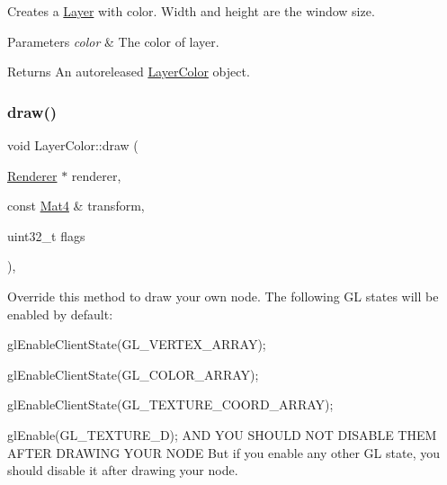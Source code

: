 Creates a \hyperlink{classLayer}{Layer} with color. Width and height are the window size.


\begin{DoxyParams}{Parameters}
{\em color} & The color of layer. \\
\hline
\end{DoxyParams}
\begin{DoxyReturn}{Returns}
An autoreleased \hyperlink{classLayerColor}{Layer\+Color} object. 
\end{DoxyReturn}
\mbox{\label{classLayerColor_ac36be7e85a4e14c1c043598c772f67e4}} 
\subsubsection{\texorpdfstring{draw()}{draw()}\hspace{0.1cm}{\footnotesize\ttfamily [1/2]}}
{\footnotesize\ttfamily void Layer\+Color\+::draw (\begin{DoxyParamCaption}\item[{\hyperlink{classRenderer}{Renderer} $\ast$}]{renderer,  }\item[{const \hyperlink{classMat4}{Mat4} \&}]{transform,  }\item[{uint32\+\_\+t}]{flags }\end{DoxyParamCaption})\hspace{0.3cm}{\ttfamily [override]}, {\ttfamily [virtual]}}

Override this method to draw your own node. The following GL states will be enabled by default\+:
\begin{DoxyItemize}
\item {\ttfamily gl\+Enable\+Client\+State(\+G\+L\+\_\+\+V\+E\+R\+T\+E\+X\+\_\+\+A\+R\+R\+A\+Y);}
\item {\ttfamily gl\+Enable\+Client\+State(\+G\+L\+\_\+\+C\+O\+L\+O\+R\+\_\+\+A\+R\+R\+A\+Y);}
\item {\ttfamily gl\+Enable\+Client\+State(\+G\+L\+\_\+\+T\+E\+X\+T\+U\+R\+E\+\_\+\+C\+O\+O\+R\+D\+\_\+\+A\+R\+R\+A\+Y);}
\item {\ttfamily gl\+Enable(\+G\+L\+\_\+\+T\+E\+X\+T\+U\+R\+E\+\_\+D);} A\+ND Y\+OU S\+H\+O\+U\+LD N\+OT D\+I\+S\+A\+B\+LE T\+H\+EM A\+F\+T\+ER D\+R\+A\+W\+I\+NG Y\+O\+UR N\+O\+DE But if you enable any other GL state, you should disable it after drawing your node.
\end{DoxyItemize}


